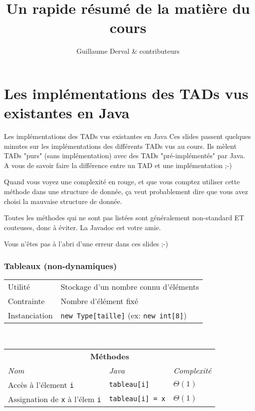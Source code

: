 \documentclass[8pt,aspectratio=169]{beamer}
\begin{document}
	\author{Guillaume Derval \& contributeurs}
	\title{Un rapide résumé de la matière du cours}
	\begin{frame}[plain]
	\maketitle
\end{frame}

\section{Les implémentations des TADs vus existantes en Java}

\begin{frame}{Les implémentations des TADs vus existantes en Java}
Ces slides passent quelques minutes sur les implémentations des différents TADs vus au cours. Ils mèlent TADs "purs" (sans implémentation) avec des TADs "pré-implémentés" par Java.
A vous de savoir faire la différence entre un TAD et une implémentation ;-)

Quand vous voyez une complexité en rouge, et que vous comptez utiliser cette méthode dans une structure de donnée, ça veut probablement dire que vous avez choisi la mauvaise structure de donnée.

Toutes les méthodes qui ne sont pas listées sont généralement non-standard ET couteuses, donc à éviter. La Javadoc est votre amie.

Vous n'êtes pas à l'abri d'une erreur dans ces slides ;-)
\end{frame}

\begin{frame}
\frametitle{Tableaux (non-dynamiques)}
\centering
\begin{tabular}{lll}
	Utilité & \multicolumn{2}{l}{Stockage d'un nombre connu d'éléments}\\
	Contrainte & \multicolumn{2}{l}{Nombre d'élément fixé}\\
	Instanciation & \multicolumn{2}{l}{\texttt{new Type[taille]} (ex: \texttt{new int[8]})}\\
\end{tabular}\\
\vspace{0.5cm}
\centering
\begin{tabular}{lll}
	\multicolumn{3}{c}{\textbf{Méthodes}} \\
	\textit{Nom} & \textit{Java} & \textit{Complexité} \\
	Accès à l'élement \texttt{i} & \texttt{tableau[i]} & $\Theta(1)$\\
	Assignation de \texttt{x} à l'élem \texttt{i} & \texttt{tableau[i] = x} & $\Theta(1)$\\
\end{tabular}
\end{frame}
\end{document}
